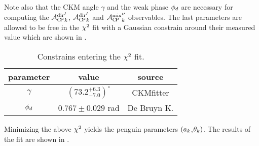 \noindent Note also that the CKM angle $\gamma$ and the weak phase $\phi_{d}$ are necessary for computing the ${\mathcal{A}_{\rm C\!P}^{\rm dir}}'_k$,
${\mathcal{A}_{\rm C\!P}^{\rm dir}}'_k$ and ${\mathcal{A}_{\rm C\!P}^{\rm mix}}''_k$ observables. The last parameters are allowed to be free in the
$\chi^2$ fit with a Gaussian constrain around their measured value which are shown in .

\begin{table}[!h]
  \center
  \begin{tabular}{c c c}
    \hline
    parameter & value & source \\
    \hline
    $\gamma$      & $\left(73.2_{-7.0}^{+6.3}\right)^{\circ}$ & CKMfitter \cite{Charles:2015gya} \\
    $\phi_{d}$       & $0.767 \pm 0.029$ rad & De Bruyn K.\cite{DeBruyn-thesis} \\
    \hline
  \end{tabular}
  \caption{\small Constrains entering the $\chi^2$ fit.}
  \label{chi2_fit_constrains}
\end{table}

\noindent Minimizing the above $\chi^2$ yields the penguin parameters $(a_k$,$\theta_k)$.
The results of the fit are shown in .
